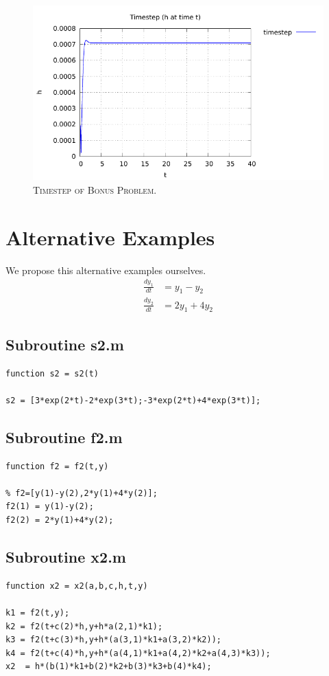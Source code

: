 \documentclass[a4paper,oneside]{book}
\numberwithin{equation}{chapter}
\begin{document}
\begin{figure}[H]
\centering
\includegraphics[scale=1.1]{f_ts}
\caption{\textsc{Timestep of Bonus Problem.}}
\end{figure}

\section{Alternative Examples}
We propose this alternative examples ourselves.
\begin{align}
\frac{{d{y_1}}}{{dt}} &= {y_1} - {y_2}\\
\frac{{d{y_2}}}{{dt}} &= 2{y_1} + 4{y_2}
\end{align}
\subsection{Subroutine s2.m}
\begin{verbatim}
function s2 = s2(t)

s2 = [3*exp(2*t)-2*exp(3*t);-3*exp(2*t)+4*exp(3*t)];
\end{verbatim}
\subsection{Subroutine f2.m}
\begin{verbatim}
function f2 = f2(t,y)

% f2=[y(1)-y(2),2*y(1)+4*y(2)];
f2(1) = y(1)-y(2);
f2(2) = 2*y(1)+4*y(2);
\end{verbatim}
\subsection{Subroutine x2.m}
\begin{verbatim}
function x2 = x2(a,b,c,h,t,y)

k1 = f2(t,y);
k2 = f2(t+c(2)*h,y+h*a(2,1)*k1);
k3 = f2(t+c(3)*h,y+h*(a(3,1)*k1+a(3,2)*k2));
k4 = f2(t+c(4)*h,y+h*(a(4,1)*k1+a(4,2)*k2+a(4,3)*k3));
x2  = h*(b(1)*k1+b(2)*k2+b(3)*k3+b(4)*k4);
\end{verbatim}
\end{document}
